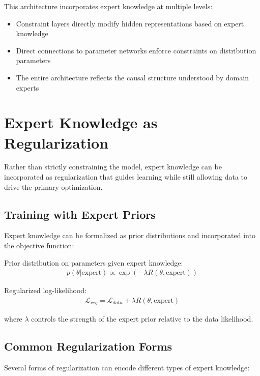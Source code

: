 This architecture incorporates expert knowledge at multiple levels:
\begin{itemize}
    \item Constraint layers directly modify hidden representations based on expert knowledge
    \item Direct connections to parameter networks enforce constraints on distribution parameters
    \item The entire architecture reflects the causal structure understood by domain experts
\end{itemize}

\section{Expert Knowledge as Regularization}

Rather than strictly constraining the model, expert knowledge can be incorporated as regularization that guides learning while still allowing data to drive the primary optimization.

\subsection{Training with Expert Priors}

Expert knowledge can be formalized as prior distributions and incorporated into the objective function:

\begin{equationbox}[title=Expert-Guided Regularization]
Prior distribution on parameters given expert knowledge:
\begin{align}
    p(\theta | \text{expert}) \propto \exp(-\lambda R(\theta, \text{expert}))
\end{align}

Regularized log-likelihood:
\begin{align}
    \mathcal{L}_{reg} = \mathcal{L}_{data} + \lambda R(\theta, \text{expert})
\end{align}

where $\lambda$ controls the strength of the expert prior relative to the data likelihood.
\end{equationbox}

\subsection{Common Regularization Forms}

Several forms of regularization can encode different types of expert knowledge:

